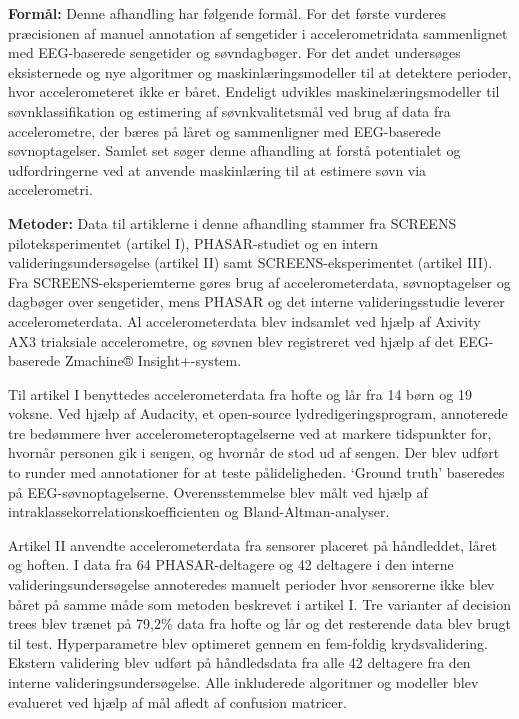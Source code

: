 \documentclass[
  10pt,
]{scrbook}
\let\originaltextbf\textbf
\renewcommand{\textbf}[1]{\textcolor{color1}{\originaltextbf{#1}}}
\begin{document}
\textbf{Formål:} Denne afhandling har følgende formål. For det første
vurderes præcisionen af manuel annotation af sengetider i
accelerometridata sammenlignet med EEG-baserede sengetider og
søvndagbøger. For det andet undersøges eksisternede og nye algoritmer og
maskinlæringsmodeller til at detektere perioder, hvor accelerometeret
ikke er båret. Endeligt udvikles maskinelæringsmodeller til
søvnklassifikation og estimering af søvnkvalitetsmål ved brug af data
fra accelerometre, der bæres på låret og sammenligner med EEG-baserede
søvnoptagelser. Samlet set søger denne afhandling at forstå potentialet
og udfordringerne ved at anvende maskinlæring til at estimere søvn via
accelerometri.

\textbf{Metoder:} Data til artiklerne i denne afhandling stammer fra
SCREENS piloteksperimentet (artikel I), PHASAR-studiet og en intern
valideringsundersøgelse (artikel II) samt SCREENS-eksperimentet (artikel
III). Fra SCREENS-eksperiemterne gøres brug af accelerometerdata,
søvnoptagelser og dagbøger over sengetider, mens PHASAR og det interne
valideringsstudie leverer accelerometerdata. Al accelerometerdata blev
indsamlet ved hjælp af Axivity AX3 triaksiale accelerometre, og søvnen
blev registreret ved hjælp af det EEG-baserede Zmachine®
Insight+-system.

Til artikel I benyttedes accelerometerdata fra hofte og lår fra 14 børn
og 19 voksne. Ved hjælp af Audacity, et open-source
lydredigeringsprogram, annoterede tre bedømmere hver
accelerometeroptagelserne ved at markere tidspunkter for, hvornår
personen gik i sengen, og hvornår de stod ud af sengen. Der blev udført
to runder med annotationer for at teste pålideligheden. `Ground truth'
baseredes på EEG-søvnoptagelserne. Overensstemmelse blev målt ved hjælp
af intraklassekorrelationskoefficienten og Bland-Altman-analyser.

Artikel II anvendte accelerometerdata fra sensorer placeret på
håndleddet, låret og hoften. I data fra 64 PHASAR-deltagere og 42
deltagere i den interne valideringsundersøgelse annoteredes manuelt
perioder hvor sensorerne ikke blev båret på samme måde som metoden
beskrevet i artikel I. Tre varianter af decision trees blev trænet på
79,2\% data fra hofte og lår og det resterende data blev brugt til test.
Hyperparametre blev optimeret gennem en fem-foldig krydsvalidering.
Ekstern validering blev udført på håndledsdata fra alle 42 deltagere fra
den interne valideringsundersøgelse. Alle inkluderede algoritmer og
modeller blev evalueret ved hjælp af mål afledt af confusion matricer.
\end{document}

